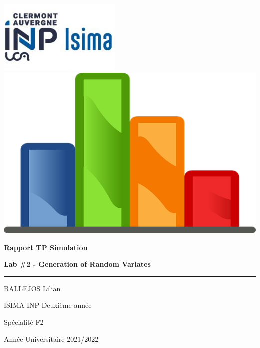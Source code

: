 \documentclass[12pt,french]{article} %
\begin{document}
\begin{titlepage} %

  
  \includegraphics[scale=0.6]{isima.png}
  \includegraphics[scale=0.25]{deco.png}
  
  \vspace*{2.5cm} %
  
  \begin{center}\huge
    \textbf{Rapport TP Simulation} 
    
    \textbf{Lab \#2 - Generation of Random Variates}
  \end{center}
  
  \hrule %
  
  \begin{center}
    \Large BALLEJOS Lilian
    
    \large
    ISIMA INP Deuxième année
    
    Spécialité F2
    
    Année Universitaire 2021/2022
  \end{center}
  
  \begin{center}
  \end{center}
  

\end{titlepage}
\end{document}
